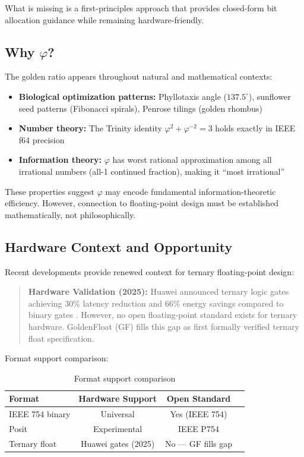 \documentclass{article}
\begin{document}
What is missing is a first-principles approach that provides closed-form bit allocation guidance while remaining hardware-friendly.

\subsection{Why $\varphi$?}

The golden ratio appears throughout natural and mathematical contexts:
\begin{itemize}
    \item \textbf{Biological optimization patterns:} Phyllotaxis angle ($137.5^\circ$), sunflower seed patterns (Fibonacci spirals), Penrose tilings (golden rhombus)
    \item \textbf{Number theory:} The Trinity identity $\varphi^2 + \varphi^{-2} = 3$ holds exactly in IEEE f64 precision
    \item \textbf{Information theory:} $\varphi$ has worst rational approximation among all irrational numbers (all-1 continued fraction), making it ``most irrational''
\end{itemize}

These properties suggest $\varphi$ may encode fundamental information-theoretic efficiency. However, connection to floating-point design must be established mathematically, not philosophically.

\subsection{Hardware Context and Opportunity}

Recent developments provide renewed context for ternary floating-point design:

\begin{quote}
\textbf{Hardware Validation (2025):} Huawei announced ternary logic gates achieving 30\% latency reduction and 66\% energy savings compared to binary gates \cite{huawei2025}. However, no open floating-point standard exists for ternary hardware. GoldenFloat (GF) fills this gap as first formally verified ternary float specification.
\end{quote}

Format support comparison:

\begin{table}[h]
\centering
\begin{tabular}{lccc}
\toprule
Format & Hardware Support & Open Standard \\
\midrule
IEEE 754 binary & Universal & Yes (IEEE 754) \\
Posit & Experimental & IEEE P754 \\
Ternary float & Huawei gates (2025) & No --- GF fills gap \\
\bottomrule
\end{tabular}
\caption{Format support comparison}
\end{table}
\end{document}
